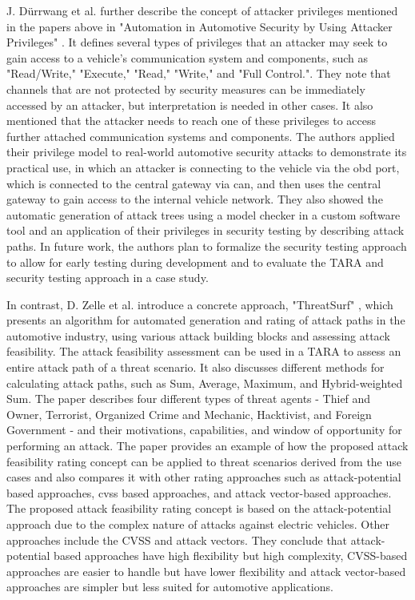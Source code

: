 J. Dürrwang et al. further describe the concept of attacker privileges mentioned in the papers above in "Automation in Automotive Security by Using Attacker Privileges" \cite{attacker_privileges}.
It defines several types of privileges that an attacker may seek to gain access to a vehicle's communication system and components, such as "Read/Write," "Execute," "Read," "Write," and "Full Control.".
They note that channels that are not protected by security measures can be immediately accessed by an attacker, but interpretation is needed in other cases. 
It also mentioned that the attacker needs to reach one of these privileges to access further attached communication systems and components.
The authors applied their privilege model to real-world automotive security attacks to demonstrate its practical use, in which
an attacker is connecting to the vehicle via the \gls{obd} port, which is connected to the central gateway via \gls{can}, and then uses the central gateway to gain access to the internal vehicle network.
They also showed the automatic generation of attack trees using a model checker in a custom software tool and an application of their privileges in security testing by describing attack paths. 
In future work, the authors plan to formalize the security testing approach to allow for early testing during development and to evaluate the TARA and security testing approach in a case study.

In contrast, D. Zelle et al. introduce a concrete approach, "ThreatSurf" \cite{threat_surf}, which presents an algorithm for automated generation and rating of 
attack paths in the automotive industry, using various attack building blocks and assessing attack feasibility.
The attack feasibility assessment can be used in a TARA to assess an entire attack path of a threat scenario.
It also discusses different methods for calculating attack paths, such as Sum, Average, Maximum, and Hybrid-weighted Sum. 
The paper describes four different types of threat agents - Thief and Owner, Terrorist, Organized Crime and Mechanic, Hacktivist, and Foreign Government - 
and their motivations, capabilities, and window of opportunity for performing an attack. 
The paper provides an example of how the proposed attack feasibility rating concept can be applied to threat scenarios derived from the use cases and also 
compares it with other rating approaches such as attack-potential based approaches, \gls{cvss} based approaches, and attack vector-based approaches.
The proposed attack feasibility rating concept is based on the attack-potential approach due to the complex nature of attacks against electric vehicles.
Other approaches include the CVSS and attack vectors.
They conclude that attack-potential based approaches have high flexibility but high complexity, 
CVSS-based approaches are easier to handle but have lower flexibility and attack vector-based approaches are simpler but less suited for automotive applications. 




